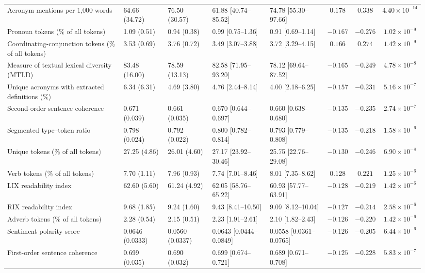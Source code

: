 \begin{landscape}
\begin{longtable}{@{}p{5.2cm}p{2.65cm}p{2.65cm}p{2.85cm}p{2.85cm}ccc@{}}
Acronym mentions per 1,000 words & 64.66 (34.72) & 76.50 (30.57) & 61.88 [40.74--85.52] & 74.78 [55.30--97.66] & $0.178$ & $0.338$ & $4.40 \times 10^{-14}$ \\
Pronoun tokens (\% of all tokens) & 1.09 (0.51) & 0.94 (0.38) & 0.99 [0.75--1.36] & 0.91 [0.69--1.14] & $-0.167$ & $-0.276$ & $1.02 \times 10^{-9}$ \\
Coordinating-conjunction tokens (\% of all tokens) & 3.53 (0.69) & 3.76 (0.72) & 3.49 [3.07--3.88] & 3.72 [3.29--4.15] & $0.166$ & $0.274$ & $1.42 \times 10^{-9}$ \\
Measure of textual lexical diversity (MTLD) & 83.48 (16.00) & 78.59 (13.13) & 82.58 [71.95--93.20] & 78.12 [69.64--87.52] & $-0.165$ & $-0.249$ & $4.78 \times 10^{-8}$ \\
Unique acronyms with extracted definitions (\%) & 6.34 (6.31) & 4.69 (3.80) & 4.76 [2.44--8.14] & 4.00 [2.18--6.25] & $-0.157$ & $-0.231$ & $5.16 \times 10^{-7}$ \\
Second-order sentence coherence & 0.671 (0.039) & 0.661 (0.035) & 0.670 [0.644--0.697] & 0.660 [0.638--0.680] & $-0.135$ & $-0.235$ & $2.74 \times 10^{-7}$ \\
Segmented type--token ratio & 0.798 (0.024) & 0.792 (0.022) & 0.800 [0.782--0.814] & 0.793 [0.779--0.808] & $-0.135$ & $-0.218$ & $1.58 \times 10^{-6}$ \\
Unique tokens (\% of all tokens) & 27.25 (4.86) & 26.01 (4.60) & 27.17 [23.92--30.46] & 25.75 [22.76--29.08] & $-0.130$ & $-0.246$ & $6.90 \times 10^{-8}$ \\
Verb tokens (\% of all tokens) & 7.70 (1.11) & 7.96 (0.93) & 7.74 [7.01--8.46] & 8.01 [7.35--8.62] & $0.128$ & $0.221$ & $1.25 \times 10^{-6}$ \\
LIX readability index & 62.60 (5.60) & 61.24 (4.92) & 62.05 [58.76--65.22] & 60.93 [57.77--63.91] & $-0.128$ & $-0.219$ & $1.42 \times 10^{-6}$ \\
RIX readability index & 9.68 (1.85) & 9.24 (1.60) & 9.43 [8.41--10.50] & 9.09 [8.12--10.04] & $-0.127$ & $-0.214$ & $2.58 \times 10^{-6}$ \\
Adverb tokens (\% of all tokens) & 2.28 (0.54) & 2.15 (0.51) & 2.23 [1.91--2.61] & 2.10 [1.82--2.43] & $-0.126$ & $-0.220$ & $1.42 \times 10^{-6}$ \\
Sentiment polarity score & 0.0646 (0.0333) & 0.0560 (0.0337) & 0.0643 [0.0444--0.0849] & 0.0558 [0.0361--0.0765] & $-0.126$ & $-0.205$ & $6.44 \times 10^{-6}$ \\
First-order sentence coherence & 0.699 (0.035) & 0.690 (0.032) & 0.699 [0.674--0.721] & 0.689 [0.671--0.708] & $-0.125$ & $-0.228$ & $5.83 \times 10^{-7}$ \\

\end{longtable}
\end{landscape}
